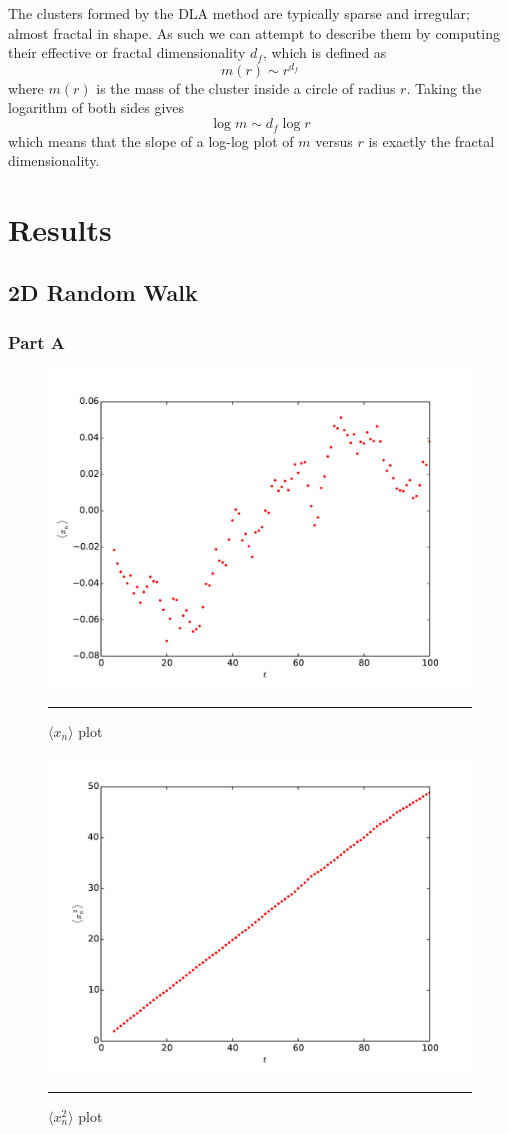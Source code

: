 \documentclass[notitlepage,aps,prd,nofootinbib]{revtex4-1}
\begin{document}
The clusters formed by the DLA method are typically sparse and irregular; almost fractal in shape. As such we can attempt to describe them by computing their effective or fractal dimensionality $d_f$, which is defined as
\begin{equation}
m(r)\sim r^{d_f}
\end{equation}
where $m(r)$ is the mass of the cluster inside a circle of radius $r$. Taking the logarithm of both sides gives
\begin{equation}
\log m \sim d_f \log r
\end{equation}
which means that the slope of a log-log plot of $m$ versus $r$ is exactly the fractal dimensionality.



\clearpage
\section{Results}
\label{sec:results}
\subsection{2D Random Walk}
\subsubsection{Part A}
\begin{figure}[!htbc]
  \centering
  \includegraphics[width=.6\textwidth]{../output/plots_for_paper/problem_1/xn_Plot.pdf}
  	{\par\nobreak\rule[9pt]{35em}{0.5pt}\vspace{-5mm}}
	\caption{$\langle x_{n} \rangle$ plot}
	\label{fig:1_a_1}
  \includegraphics[width=.6\textwidth]{../output/plots_for_paper/problem_1/xn2_Plot.pdf}
  	{\par\nobreak\rule[9pt]{35em}{0.5pt}\vspace{-5mm}}
	\caption{$\langle x_{n}^{2} \rangle$ plot}
	\label{fig:1_a_2}
\end{figure}
\end{document}
